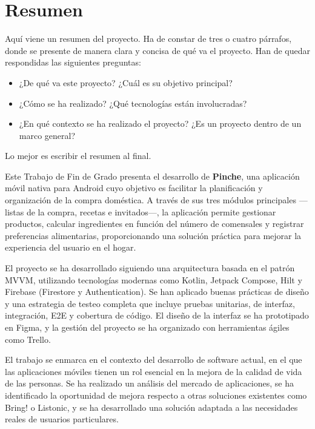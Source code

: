 \chapter*{Resumen}

Aquí viene un resumen del proyecto. Ha de constar de tres o cuatro párrafos, donde se presente de manera clara y concisa de qué va el proyecto.
Han de quedar respondidas las siguientes preguntas:

\begin{itemize}
  \item ¿De qué va este proyecto? ¿Cuál es su objetivo principal?
  \item ¿Cómo se ha realizado? ¿Qué tecnologías están involucradas?
  \item ¿En qué contexto se ha realizado el proyecto? ¿Es un proyecto dentro de un marco general?
\end{itemize}

Lo mejor es escribir el resumen al final.

Este Trabajo de Fin de Grado presenta el desarrollo de \textbf{Pinche}, una aplicación móvil nativa para Android cuyo objetivo es facilitar la planificación y organización de la compra doméstica. A través de sus tres módulos principales —listas de la compra, recetas e invitados—, la aplicación permite gestionar productos, calcular ingredientes en función del número de comensales y registrar preferencias alimentarias, proporcionando una solución práctica para mejorar la experiencia del usuario en el hogar.

El proyecto se ha desarrollado siguiendo una arquitectura basada en el patrón MVVM, utilizando tecnologías modernas como Kotlin, Jetpack Compose, Hilt y Firebase (Firestore y Authentication). Se han aplicado buenas prácticas de diseño y una estrategia de testeo completa que incluye pruebas unitarias, de interfaz, integración, E2E y cobertura de código. El diseño de la interfaz se ha prototipado en Figma, y la gestión del proyecto se ha organizado con herramientas ágiles como Trello.

El trabajo se enmarca en el contexto del desarrollo de software actual, en el que las aplicaciones móviles tienen un rol esencial en la mejora de la calidad de vida de las personas. Se ha realizado un análisis del mercado de aplicaciones, se ha identificado la oportunidad de mejora respecto a otras soluciones existentes como Bring! o Listonic, y se ha desarrollado una solución adaptada a las necesidades reales de usuarios particulares.
